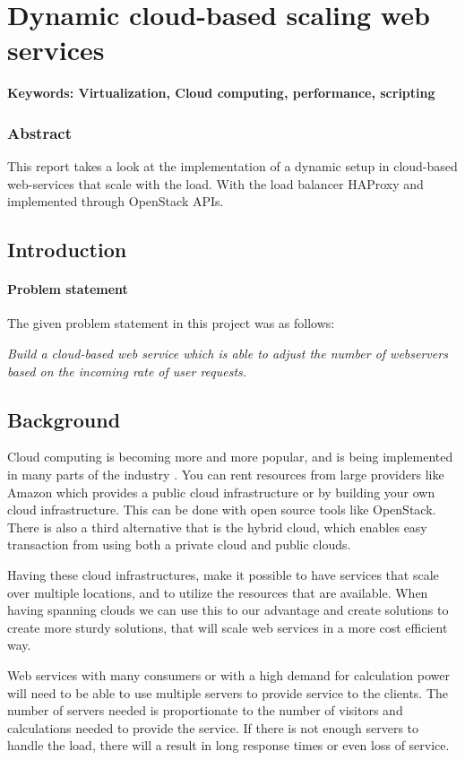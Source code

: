 \chapter{Dynamic cloud-based scaling web services}
\textbf{Keywords: Virtualization, Cloud computing, performance, scripting}

\subsection*{Abstract}

This report takes a look at the implementation of a dynamic setup in cloud-based
web-services that scale with the load. With the load balancer HAProxy and
implemented through OpenStack APIs.

\section{Introduction}

\subsubsection{Problem statement}

The given problem statement in this project was as follows:

\emph{Build a cloud-based web service which is able to adjust the number of
webservers based on the incoming rate of user requests.}

\section{Background}
Cloud computing is becoming more and more popular, and is being implemented
in many parts of the industry \cite{OpenStack:Users}. You can rent resources 
from large providers like Amazon which provides a public cloud infrastructure 
or by building your own cloud infrastructure. This can be done with open source 
tools like OpenStack. There is also a third alternative that is the hybrid cloud,
which enables easy transaction from using both a private cloud and public clouds.

Having these cloud infrastructures, make it possible to have services
that scale over multiple locations, and to utilize the resources that are
available. When having spanning clouds we can use this to our advantage 
and create solutions to create more sturdy solutions, that will scale web
services in a more cost efficient way.

Web services with many consumers or with a high demand for calculation power
will need to be able to use multiple servers to provide service to the clients.
The number of servers needed is proportionate to the number of visitors and
calculations needed to provide the service. If there is not enough servers to
handle the load, there will a result in long response times or even loss of
service.

